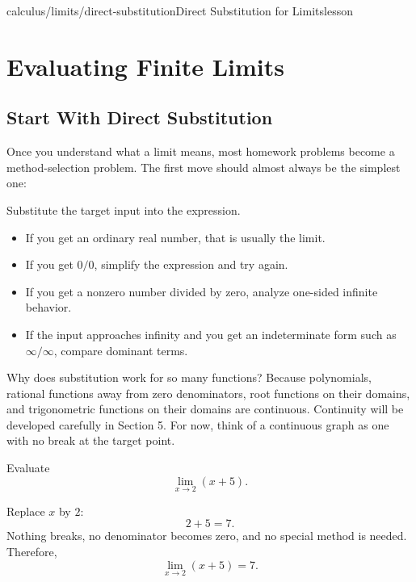 \begin{webpage}{calculus/limits/direct-substitution}{Direct Substitution for Limits}{lesson}
\chapter{Evaluating Finite Limits}

\section{Start With Direct Substitution}


Once you understand what a limit means, most homework problems become a method-selection problem. The first move should almost always be the simplest one:

\begin{bgmethod}[title={First Move for Nearly Every Limit}]
Substitute the target input into the expression.

\begin{itemize}
  \item If you get an ordinary real number, that is usually the limit.
  \item If you get \(0/0\), simplify the expression and try again.
  \item If you get a nonzero number divided by zero, analyze one-sided infinite behavior.
  \item If the input approaches infinity and you get an indeterminate form such as \(\infty/\infty\), compare dominant terms.
\end{itemize}
\end{bgmethod}

Why does substitution work for so many functions? Because polynomials, rational functions away from zero denominators, root functions on their domains, and trigonometric functions on their domains are continuous. Continuity will be developed carefully in Section 5. For now, think of a continuous graph as one with no break at the target point.

\begin{bgguided}[title={Substitute and stop}]
Evaluate
\[
  \lim_{x\to2}(x+5).
\]

\begin{bgsolution}
Replace \(x\) by \(2\):
\[
  2+5=7.
\]
Nothing breaks, no denominator becomes zero, and no special method is needed. Therefore,
\[
  \boxed{\lim_{x\to2}(x+5)=7}.
\]
\end{bgsolution}
\end{bgguided}


\end{webpage}

